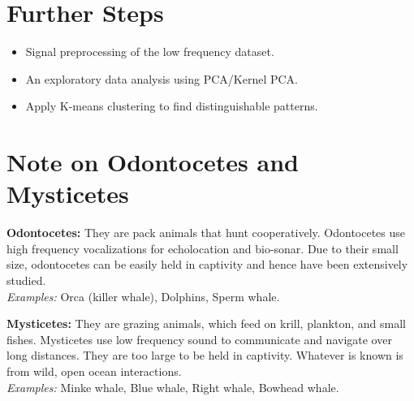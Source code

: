 \documentclass[final]{article}
\begin{document}
\section{Further Steps}
\begin{itemize}
\item Signal preprocessing of the low frequency dataset. 
\item An exploratory data analysis using PCA/Kernel PCA. 
\item Apply K-means clustering to find distinguishable patterns.
\end{itemize}

\section*{Note on Odontocetes and Mysticetes}
\textbf{Odontocetes:} They are pack animals that hunt cooperatively. Odontocetes use high frequency vocalizations for echolocation and bio-sonar. Due to their small size, odontocetes can be easily held in captivity and hence have been extensively studied. \\
\textit{Examples:} Orca (killer whale), Dolphins, Sperm whale. 

\textbf{Mysticetes:} They are grazing animals, which feed on krill, plankton, and small fishes. Mysticetes use low frequency sound to communicate and navigate over long distances. They are too large to be held in captivity. Whatever is known is from wild, open ocean interactions. \\
\textit{Examples:} Minke whale, Blue whale, Right whale, Bowhead whale.




\end{document}

